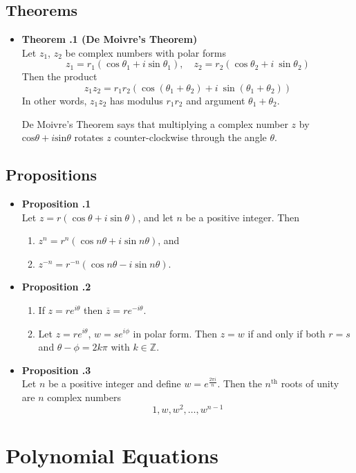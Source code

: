 \documentclass[a4paper,12pt]{article}
\newcommand{\prop}[1]{
    \item \textbf{Proposition \thesection.#1}\\
}
\newcommand{\theo}[1]{
    \item \textbf{Theorem \thesection.#1}\\
}
\begin{document}
\subsection{Theorems}
\begin{itemize}
    \theo {1 (De Moivre's Theorem)}
    Let $z_1$, $z_2$ be complex numbers with polar forms
        $$ z_1 = r_1(\cos\theta_1 + i\sin\theta_1), \quad z_2 = r_2(\cos\theta_2 + i\ \sin\theta_2) $$
    Then the product
        $$ z_1z_2 = r_1r_2 (\cos(\theta_1 + \theta_2) + i\ \sin(\theta_1 + \theta_2)) $$
    In other words, $z_1z_2$ has modulus $r_1r_2$ and argument $\theta_1 + \theta_2$.
    
    De Moivre's Theorem says that multiplying a complex number $z$ by $\text{cos}\theta + i\text{sin}\theta$ rotates $z$ counter-clockwise through the angle $\theta$.
\end{itemize}

\subsection{Propositions}
\begin{itemize}
    \prop 1
    Let $z=r(\cos\theta + i\sin\theta)$, and let $n$ be a positive integer. Then
    \begin{enumerate}
        \item $z^n = r^n(\cos n\theta + i\sin n\theta)$, and
        \item $z^{-n} = r^{-n}(\cos n\theta-i\sin n\theta)$.
    \end{enumerate}
    
    \item \textbf{Proposition \thesection.2}  %
    \begin{enumerate}
        \item If $z = re^{i\theta}$ then $\overline z = re^{-i\theta}$.
        \item Let $z = re^{i\theta}$, $w = se^{i\phi}$ in polar form. Then
        $z = w$ if and only if both
        $r = s$ and $\theta - \phi = 2k\pi$ with $k \in \mathbb{Z}$.
    \end{enumerate}
    
    \prop 3
    Let $n$ be a positive integer and define $w = e^\frac{2\pi i}{n}$. Then the $n^\text{th}$ roots of
    unity are $n$ complex numbers
        $$ 1, w, w^2, \ldots, w^{n-1} $$
\end{itemize}

\section{Polynomial Equations}
\end{document}
